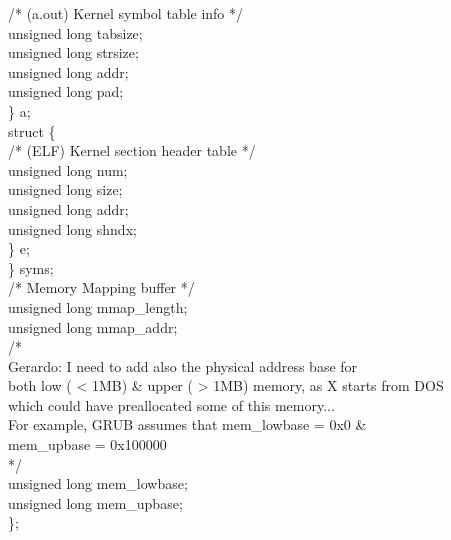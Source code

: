 \documentclass[a4paper]{report}
\begin{document}
\begin{minipage}[t]{15cm}
\begin{tt}
\begin{tabbing}
/* (a.out) Kernel symbol table info */                                  \\
\>      \>      \>      unsigned long tabsize;                          \\
\>      \>      \>      unsigned long strsize;                          \\
\>      \>      \>      unsigned long addr;                             \\
\>      \>      \>      unsigned long pad;                              \\
\>      \>      \} a;                                                   \\
\>      \>      struct \{                                               \\
/* (ELF) Kernel section header table */                                 \\
\>      \>      \>      unsigned long num;                              \\
\>      \>      \>      unsigned long size;                             \\
\>      \>      \>      unsigned long addr;                             \\
\>      \>      \>      unsigned long shndx;                            \\
\>      \>      \} e;                                                   \\
\>      \} syms;                                                        \\
/* Memory Mapping buffer */                                             \\
\>      unsigned long mmap\_length;                                     \\
\>      unsigned long mmap\_addr;                                       \\
/*                                                                      \\
Gerardo: I need to add also the physical address base for               \\
both low ( < 1MB) \& upper ( > 1MB) memory, as X starts from DOS        \\
which could have preallocated some of this memory...                    \\
For example, GRUB assumes that mem\_lowbase = 0x0 \&                    \\
mem\_upbase = 0x100000                                                  \\
 */                                                                      \\
\>      unsigned long mem\_lowbase;                                     \\
\>      unsigned long mem\_upbase;                                      \\
\};                                                                     \\
\end{tabbing}
\end{tt}
\end{minipage}
\end{document}
